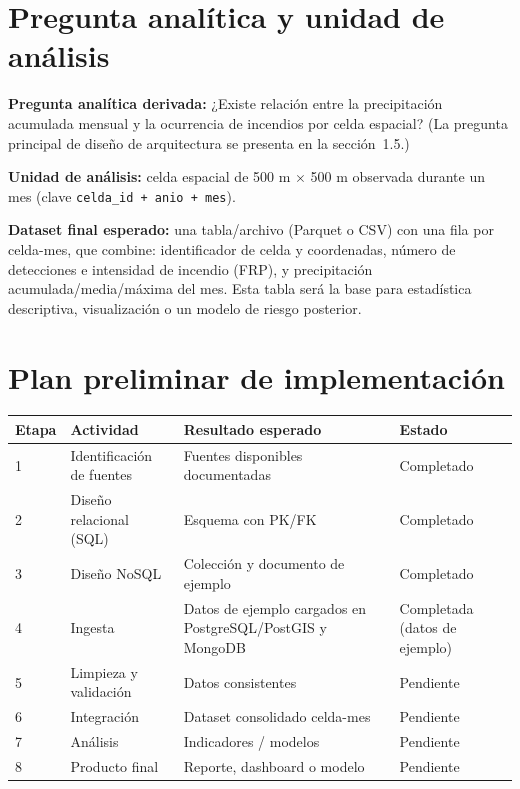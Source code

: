 \documentclass[11pt,a4paper]{article}
\begin{document}
\section{Pregunta anal\'itica y unidad de an\'alisis}

\textbf{Pregunta anal\'itica derivada:} ¿Existe relaci\'on entre la precipitaci\'on acumulada mensual y la ocurrencia de incendios por celda espacial? (La pregunta principal de dise\~no de arquitectura se presenta en la secci\'on~1.5.)

\textbf{Unidad de an\'alisis:} celda espacial de 500 m $\times$ 500 m observada durante un mes (clave \texttt{celda\_id + anio + mes}).

\textbf{Dataset final esperado:} una tabla/archivo (Parquet o CSV) con una fila por celda-mes, que combine: identificador de celda y coordenadas, n\'umero de detecciones e intensidad de incendio (FRP), y precipitaci\'on acumulada/media/m\'axima del mes. Esta tabla ser\'a la base para estad\'istica descriptiva, visualizaci\'on o un modelo de riesgo posterior.

\section{Plan preliminar de implementaci\'on}

\begin{center}
\small
\begin{tabular}{@{}C{1.0cm}L{3.3cm}L{6.0cm}C{2.3cm}@{}}
\toprule
\textbf{Etapa} & \textbf{Actividad} & \textbf{Resultado esperado} & \textbf{Estado} \\
 & Identificaci\'on de fuentes & Fuentes disponibles documentadas & Completado \\
2 & Dise\~no relacional (SQL) & Esquema con PK/FK & Completado \\
3 & Dise\~no NoSQL & Colecci\'on y documento de ejemplo & Completado \\
4 & Ingesta & Datos de ejemplo cargados en PostgreSQL/PostGIS y MongoDB & Completada (datos de ejemplo) \\
5 & Limpieza y validaci\'on & Datos consistentes & Pendiente \\
6 & Integraci\'on & Dataset consolidado celda-mes & Pendiente \\
7 & An\'alisis & Indicadores / modelos & Pendiente \\
8 & Producto final & Reporte, dashboard o modelo & Pendiente \\
\bottomrule
\end{tabular}
\end{center}
\end{document}
